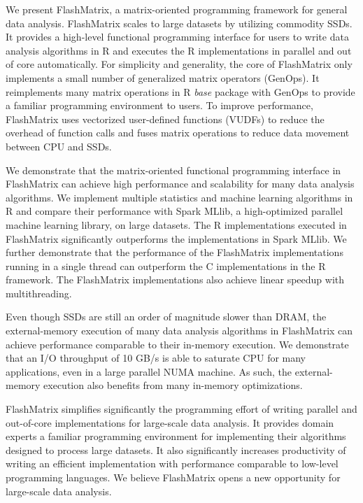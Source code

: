 We present FlashMatrix, a matrix-oriented programming framework for general
data analysis. FlashMatrix scales to large datasets by utilizing commodity SSDs.
It provides a high-level functional programming interface for users to write
data analysis algorithms in R and
executes the R implementations in parallel and out of core automatically.
For simplicity and generality, the core of FlashMatrix only implements
a small number of generalized matrix operators (GenOps). It reimplements
many matrix operations in R \textit{base} package with GenOps to provide
a familiar programming environment to users. To improve performance,
FlashMatrix uses vectorized user-defined functions (VUDFs) to reduce the
overhead of function calls and fuses matrix operations to reduce data movement
between CPU and SSDs.

We demonstrate that the matrix-oriented functional programming interface in
FlashMatrix can achieve high performance and scalability for many data analysis
algorithms. We implement multiple statistics and
machine learning algorithms in R and compare their performance with Spark
MLlib, a high-optimized parallel machine learning library, on large datasets.
The R implementations executed in FlashMatrix significantly outperforms
the implementations in Spark MLlib. We further demonstrate that the performance
of the FlashMatrix implementations running in a single thread can outperform
the C implementations in the R framework. The FlashMatrix implementations
also achieve linear speedup with multithreading.

Even though SSDs are still an order of magnitude slower than DRAM, the external-memory
execution of many data analysis algorithms in FlashMatrix can achieve performance
comparable to their in-memory execution. We demonstrate that an I/O throughput
of 10 GB/s is able to saturate CPU for many applications, even in a large parallel
NUMA machine. As such, the external-memory execution also benefits from many in-memory
optimizations.

FlashMatrix simplifies significantly the programming effort of writing
parallel and out-of-core implementations for large-scale data analysis. It
provides domain experts a familiar programming environment for implementing
their algorithms designed to process large datasets. It also significantly
increases productivity of writing an efficient implementation with performance
comparable to low-level programming languages. We believe FlashMatrix opens
a new opportunity for large-scale data analysis.
